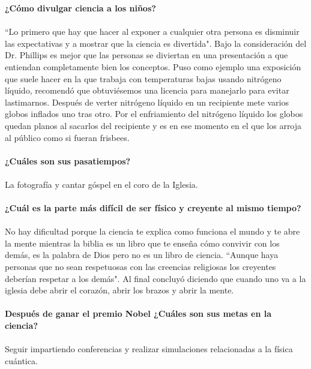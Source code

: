 \documentclass[10pt,letterpaper]{article}
\begin{document}
\textbf{¿Cómo divulgar ciencia a los niños?}
\\
\\
``Lo primero que hay que hacer al exponer a cualquier otra persona es disminuir las expectativas y a mostrar que la ciencia es divertida". Bajo la consideración del Dr. Phillips es mejor que las personas se diviertan en una presentación a que entiendan completamente bien los conceptos. Puso como ejemplo una exposición que suele hacer en la que trabaja con temperaturas bajas usando nitrógeno líquido, recomendó que obtuviésemos una licencia para manejarlo para evitar lastimarnos. Después de verter nitrógeno líquido en un recipiente mete varios globos inflados uno tras otro. Por el enfriamiento del nitrógeno líquido los globos quedan planos al sacarlos del recipiente y es en ese momento en el que los arroja al público como si fueran frisbees.
\\
\\
\textbf{¿Cuáles son sus pasatiempos?}
\\
\\
La fotografía y cantar góspel en el coro de la Iglesia.
\\
\\
\textbf{¿Cuál es la parte más difícil de ser físico y creyente al mismo tiempo?}
\\
\\
No hay dificultad porque la ciencia te explica como funciona el mundo y te abre la mente mientras la biblia es un libro que te enseña cómo convivir con los demás, es la palabra de Dios pero no es un libro de ciencia. ``Aunque haya personas que no sean respetuosas con las creencias religiosas los creyentes deberían respetar a los demás". Al final concluyó diciendo que cuando uno va a la iglesia debe abrir el corazón, abrir los brazos y abrir la mente.
\\
\\
\textbf{Después de ganar el premio Nobel ¿Cuáles son sus metas en la ciencia?}
\\
\\
Seguir impartiendo conferencias y realizar simulaciones relacionadas a la física cuántica.
\end{document}
